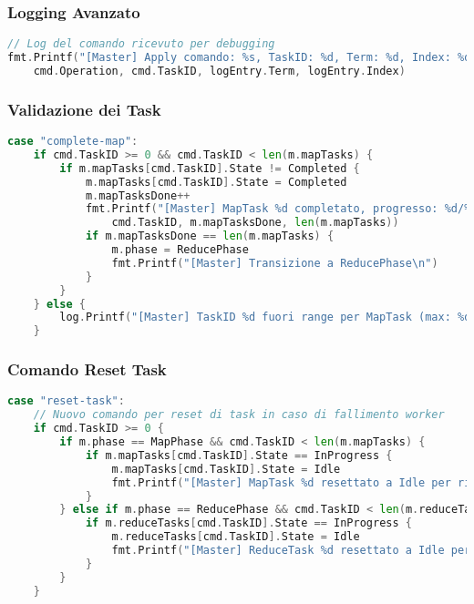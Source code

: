 \documentclass[12pt,a4paper]{article}
\begin{document}
\subsubsection{Logging Avanzato}

\begin{lstlisting}[language=go]
// Log del comando ricevuto per debugging
fmt.Printf("[Master] Apply comando: %s, TaskID: %d, Term: %d, Index: %d\n", 
    cmd.Operation, cmd.TaskID, logEntry.Term, logEntry.Index)
\end{lstlisting}

\subsubsection{Validazione dei Task}

\begin{lstlisting}[language=go]
case "complete-map":
    if cmd.TaskID >= 0 && cmd.TaskID < len(m.mapTasks) {
        if m.mapTasks[cmd.TaskID].State != Completed {
            m.mapTasks[cmd.TaskID].State = Completed
            m.mapTasksDone++
            fmt.Printf("[Master] MapTask %d completato, progresso: %d/%d\n", 
                cmd.TaskID, m.mapTasksDone, len(m.mapTasks))
            if m.mapTasksDone == len(m.mapTasks) {
                m.phase = ReducePhase
                fmt.Printf("[Master] Transizione a ReducePhase\n")
            }
        }
    } else {
        log.Printf("[Master] TaskID %d fuori range per MapTask (max: %d)\n", cmd.TaskID, len(m.mapTasks)-1)
    }
\end{lstlisting}

\subsubsection{Comando Reset Task}

\begin{lstlisting}[language=go]
case "reset-task":
    // Nuovo comando per reset di task in caso di fallimento worker
    if cmd.TaskID >= 0 {
        if m.phase == MapPhase && cmd.TaskID < len(m.mapTasks) {
            if m.mapTasks[cmd.TaskID].State == InProgress {
                m.mapTasks[cmd.TaskID].State = Idle
                fmt.Printf("[Master] MapTask %d resettato a Idle per riassegnazione\n", cmd.TaskID)
            }
        } else if m.phase == ReducePhase && cmd.TaskID < len(m.reduceTasks) {
            if m.reduceTasks[cmd.TaskID].State == InProgress {
                m.reduceTasks[cmd.TaskID].State = Idle
                fmt.Printf("[Master] ReduceTask %d resettato a Idle per riassegnazione\n", cmd.TaskID)
            }
        }
    }
\end{lstlisting}
\end{document}
